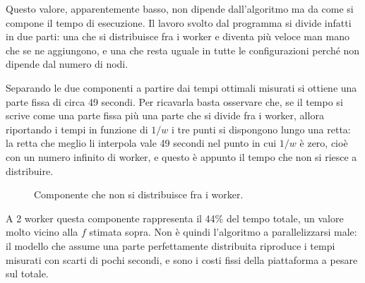 \documentclass[11pt,a4paper]{article}
\begin{document}
Questo valore, apparentemente basso, non dipende dall'algoritmo ma da come si compone il tempo di
esecuzione. Il lavoro svolto dal programma si divide infatti in due parti: una che si distribuisce
fra i worker e diventa più veloce man mano che se ne aggiungono, e una che resta uguale in tutte le
configurazioni perché non dipende dal numero di nodi.

Separando le due componenti a partire dai tempi ottimali misurati si ottiene una parte fissa di
circa 49 secondi. Per ricavarla basta osservare che, se il tempo si scrive come una parte fissa più
una parte che si divide fra i worker, allora riportando i tempi in funzione di $1/w$ i tre punti si
dispongono lungo una retta: la retta che meglio li interpola vale 49 secondi nel punto in cui
$1/w$ è zero, cioè con un numero infinito di worker, e questo è appunto il tempo che non si
riesce a distribuire.

\begin{figure}[htbp]
\centering
{}
\caption{Componente che non si distribuisce fra i worker.}
\end{figure}

A 2 worker questa componente rappresenta il 44\% del tempo totale, un valore molto vicino alla $f$ stimata sopra. 
Non è quindi l'algoritmo a parallelizzarsi male: 
il modello che assume una parte perfettamente distribuita riproduce i tempi misurati con scarti di pochi secondi, 
e sono i costi fissi della piattaforma a pesare sul totale.
\end{document}
